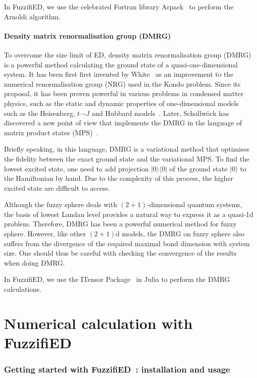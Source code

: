 \documentclass{timesjhep}
\begin{document}
In FuzzifiED, we use the celebrated Fortran library Arpack~\cite{Arpack1998} to perform the Arnoldi algorithm. 

\subsection{Density matrix renormalisation group (DMRG)}

To overcome the size limit of ED, density matrix renormalisation group (DMRG) is a powerful method calculating the ground state of a quasi-one-dimensional system. It has been first first invented by White~\cite{White1992DMRG} as an improvement to the numerical renormalisation group (NRG) used in the Kondo problem. Since its proposal, it has been proven powerful in various problems in condensed matter physics, such as the static and dynamic properties of one-dimensional models such as the Heisenberg, $t$–-$J$ and Hubbard models~\cite{Schollwock2005DMRG}. Later, Schollw\"ock has discovered a new point of view that implements the DMRG in the language of matrix product states (MPS)~\cite{Schollwoeck2010DMRG}. 

Briefly speaking, in this language, DMRG is a variational method that optimises the fidelity between the exact ground state and the variational MPS. To find the lowest excited state, one need to add projection $|0\rangle\langle 0|$ of the ground state $|0\rangle$ to the Hamiltonian by hand. Due to the complexity of this process, the higher excited state are difficult to access.

Although the fuzzy sphere deals with $(2+1)$-dimensional quantum systems, the basis of lowest Landau level provides a natural way to express it as a quasi-1d problem. Therefore, DMRG has been a powerful numerical method for fuzzy sphere. However, like other $(2+1)$d models, the DMRG on fuzzy sphere also suffers from the divergence of the required maximal bond dimension with system size. One should thus be careful with checking the convergence of the results when doing DMRG. 

In FuzzifiED, we use the ITensor Package~\cite{ITensor} in Julia to perform the DMRG calculations. 

\clearpage
\part{Numerical calculation with FuzzifiED}
\label{pt:numerics}

\section{Getting started with FuzzifiED~: installation and usage}
\label{sec:usage}
\end{document}
